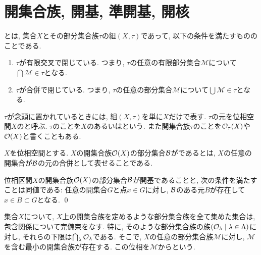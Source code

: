 \documentclass[uplatex, dvipdfmx, a4paper, 12pt, class=jsbook, crop=false]{standalone}
\begin{document}
\section{開集合族, 開基, 準開基, 開核}
\label{sec:open-sets}

\newcommand{\cM}{\mathcal{M}}

\begin{definition}
	とは, 集合$X$とその部分集合族$\tau$の組$(X, \tau)$であって, 以下の条件を満たすもののことである.
	\begin{enumerate}
		\item$\tau$が有限交叉で閉じている.
			つまり, $\tau$の任意の有限部分集合$\mathscr{M}$について$\bigcap \mathscr{M} \in \tau$となる.
		\item$\tau$が合併で閉じている.
			つまり, $\tau$の任意の部分集合$\mathscr{M}$について$\bigcup \mathscr{M} \in \tau$となる.
	\end{enumerate}
	$\tau$が念頭に置かれているときには, 組$(X, \tau)$を単に$X$だけで表す.
	$\tau$の元を位相空間$X$のと呼ぶ.
	$\tau$のことを$X$のあるいはという.
	また開集合族$\tau$のことを$\topopens_\tau (X)$や$\topopens[X]$と書くこともある.
\end{definition}

\begin{definition}
	$X$を位相空間とする.
	$X$の開集合族$\topopens[X]$の部分集合$\mathcal{B}$がであるとは, $X$の任意の開集合が$\mathcal{B}$の元の合併として表せることである.
\end{definition}

\begin{proposition}
	位相区間$X$の開集合族$\topopens[X]$の部分集合$\mathcal{B}$が開基であることと, 次の条件を満たすことは同値である: 任意の開集合$G$と点$x \in G$に対し, $\mathcal{B}$のある元$B$が存在して$x \in B \subset G$となる.
	\qed
\end{proposition}

\begin{definition}
	集合$X$について, $X$上の開集合族を定めるような部分集合族を全て集めた集合は, 包含関係について完備束をなす.
	特に, そのような部分集合族の族$\setfamily{\topopens_\lambda}{\lambda \in \Lambda}$に対し, それらの下限は$\bigcap_\lambda \topopens_\lambda$である.
	そこで, $X$の任意の部分集合族$\cM$に対し, $\cM$を含む最小の開集合族が存在する.
	この位相を$\cM$からという.
\end{definition}
\end{document}
